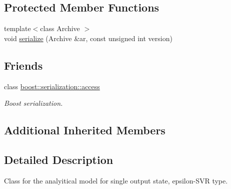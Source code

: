 \subsection*{Protected Member Functions}
\begin{DoxyCompactItemize}
\item 
{\footnotesize template$<$class Archive $>$ }\\void \hyperlink{class_go_s_u_m_1_1_c_eps_svr_s_a_m_aa981fefdc8dc0376e7fc5175cb81f66e}{serialize} (Archive \&ar, const unsigned int version)
\end{DoxyCompactItemize}
\subsection*{Friends}
\begin{DoxyCompactItemize}
\item 
class \hyperlink{class_go_s_u_m_1_1_c_eps_svr_s_a_m_ac98d07dd8f7b70e16ccb9a01abf56b9c}{boost\-::serialization\-::access}
\begin{DoxyCompactList}\small\item\em Boost serialization. \end{DoxyCompactList}\end{DoxyCompactItemize}
\subsection*{Additional Inherited Members}


\subsection{Detailed Description}
Class for the analyitical model for single output state, epsilon-\/\-S\-V\-R type. 

